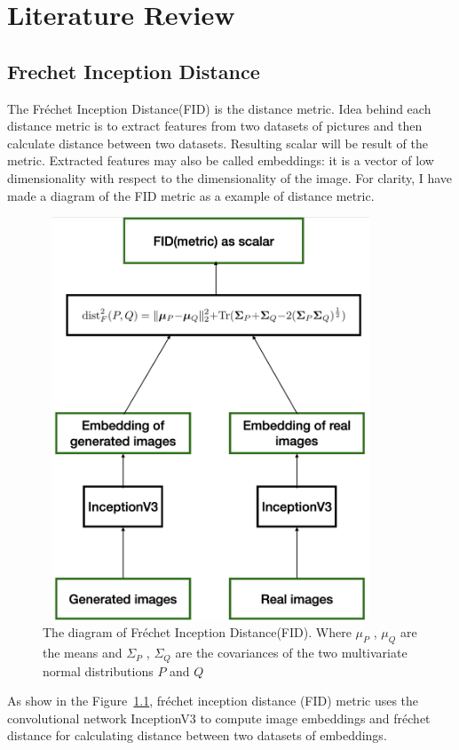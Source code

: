 \chapter{Literature Review}
\label{chap:lr}

\section{Frechet Inception Distance}
The Fréchet Inception Distance(FID) is the distance metric. Idea behind each distance metric is to extract features from two datasets of pictures and then calculate distance between two datasets. Resulting scalar will be result of the metric. Extracted features may also be called embeddings: it is a vector of low dimensionality with respect to the dimensionality of the image. For clarity, I have made a diagram of the FID metric as a example of distance metric.
\begin{figure}[hbt]
\centering
\includegraphics[width=10cm, height=12cm]{figs/fid_diagram.png}
\caption{The diagram of Fréchet Inception Distance(FID). Where $\mu_P$ , $\mu_Q$ are the means and $\Sigma_P$ , $\Sigma_Q$ are the covariances of the two multivariate normal distributions $P$ and $Q$}
\label{fig:FID_diagram}
\end{figure}
As show in the Figure~\ref{fig:FID_diagram}, fréchet inception distance (FID) metric uses the convolutional network InceptionV3 to compute image embeddings and fréchet distance for calculating distance between two datasets of embeddings.

